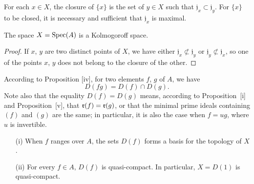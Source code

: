 \begin{corollary}[1.1.7]
\label{I.1.1.7}
For each $x\in X$, the closure of $\{x\}$ is the set of $y\in X$ such that $\mathfrak{j}_x\subset\mathfrak{j}_y$.
For $\{x\}$ to be closed, it is necessary and sufficient that $\mathfrak{j}_x$ is maximal.
\end{corollary}

\begin{corollary}[1.1.8]
\label{I.1.1.8}
The space $X=\operatorname{Spec}(A)$ is a Kolmogoroff space.
\end{corollary}

\begin{proof}
\label{proof-I.1.1.8}
If $x$, $y$ are two distinct points of $X$, we have either $\mathfrak{j}_x\not\subset\mathfrak{j}_y$ or $\mathfrak{j}_y\not\subset\mathfrak{j}_x$, so one of the points $x$, $y$ does not belong to the closure of the other.
\end{proof}

\begin{env}[1.1.9]
\label{I.1.1.9}
According to Proposition [iv], for two elements $f$, $g$ of $A$, we have
\[
  D(fg)=D(f)\cap D(g).
  \tag{1.1.9.1}
\]
Note also that the equality $D(f)=D(g)$ means, according to Proposition~[i] and Proposition~[v], that $\mathfrak{r}(f)=\mathfrak{r}(g)$, or that the minimal prime ideals containing $(f)$ and $(g)$ are the same;
in particular, it is also the case when $f=ug$, where $u$ is invertible.
\end{env}

\begin{proposition}[1.1.10]
\label{I.1.1.10}
\medskip\noindent
{}
\begin{enumerate}
  \item[{\rm(i)}] When $f$ ranges over $A$, the sets $D(f)$ forms a basis for the topology of $X$.
  \item[{\rm(ii)}] For every $f\in A$, $D(f)$ is quasi-compact.
    In particular, $X=D(1)$ is quasi-compact.
\end{enumerate}
\end{proposition}


